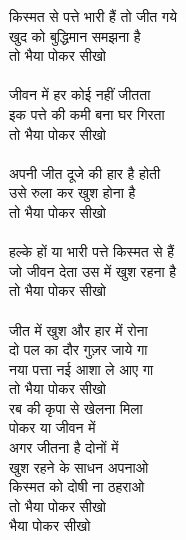 {{{{किस्मत से पत्ते भारी हैं तो जीत गये\\
खुद को बुद्धिमान समझना है\\
तो भैया पोकर सीखो\\
\\
जीवन में हर कोई नहीं जीतता\\
इक पत्ते की कमी बना घर गिरता\\
तो भैया पोकर सीखो\\
\\
अपनी जीत दूजे की हार है होती\\
उसे रुला कर खुश होना है\\
तो भैया पोकर सीखो\\
\\
हल्के हों या भारी पत्ते किस्मत से हैं\\
जो जीवन देता उस में खुश रहना है\\
तो भैया पोकर सीखो\\
\\
जीत में खुश और हार में रोना\\
दो पल का दौर गुज़र जाये गा\\
नया पत्ता नई आशा ले आए गा\\
तो भैया पोकर सीखो\\
रब की कृपा से खेलना मिला\\
पोकर या जीवन में\\
अगर जीतना है दोनों में\\
खुश रहने के साधन अपनाओ\\
किस्मत को दोषी ना ठहराओ\\
तो भैया पोकर सीखो\\
भैया पोकर सीखो\\
\\
\\
\\
}}}}
